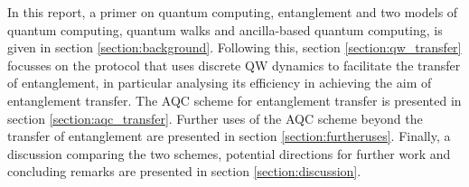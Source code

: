 In this report, a primer on quantum computing, entanglement and two models of quantum computing, quantum walks and ancilla-based quantum computing, is given in section {\ref{section:background}}.
Following this, section {\ref{section:qw_transfer}} focusses on the protocol that uses discrete QW dynamics to facilitate the transfer of entanglement, in particular analysing its efficiency in achieving the aim of entanglement transfer. 
The AQC scheme for entanglement transfer is presented in section \ref{section:aqc_transfer}. 
Further uses of the AQC scheme beyond the transfer of entanglement are presented in section \ref{section:furtheruses}. 
Finally, a discussion comparing the two schemes, potential directions for further work and concluding remarks are presented in section \ref{section:discussion}.
